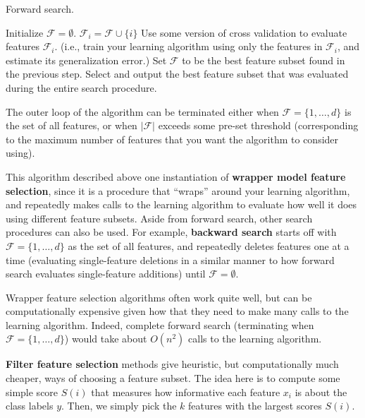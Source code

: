 \begin{algorithm}[ht]
    \caption{Forward search.}
    \label{alg:forward_search}
    \begin{algorithmic}
    \State Initialize $\mathcal{F} = \emptyset$.
    \Repeat
                \State $\mathcal{F}_i = \mathcal{F} \cup \{i\}$
                \State Use some version of cross validation to evaluate features $\mathcal{F}_i$.
                \State (i.e., train your learning algorithm using only the features in $\mathcal{F}_i$, and estimate its generalization error.)
            \EndIf
        \EndFor
        \State Set $\mathcal{F}$ to be the best feature subset found in the previous step. %
    \State Select and output the best feature subset that was evaluated during the entire search procedure.
    \end{algorithmic}
\end{algorithm}

The outer loop of the algorithm can be terminated either when $\mathcal F =
\{1,\ldots ,d\}$ is the set of all features, or when $|\mathcal F|$ exceeds some pre-set
threshold (corresponding to the maximum number of features that you want the
algorithm to consider using).

This algorithm described above one instantiation of \textbf{wrapper model
feature selection}, since it is a procedure that ``wraps'' around your learning
algorithm, and repeatedly makes calls to the learning algorithm to evaluate
how well it does using different feature subsets. Aside from forward search,
other search procedures can also be used. For example, \textbf{backward search}
starts off with $\mathcal F = \{1,\ldots ,d\}$ as the set of all features, and repeatedly deletes
features one at a time (evaluating single-feature deletions in a similar manner
to how forward search evaluates single-feature additions) until $\mathcal F = \emptyset$.

Wrapper feature selection algorithms often work quite well, but can be
computationally expensive given how that they need to make many calls to
the learning algorithm. Indeed, complete forward search (terminating when
$\mathcal F = \{1,\ldots ,d\}$) would take about $O(n^2)$ calls to the learning algorithm.

\textbf{Filter feature selection} methods give heuristic, but computationally
much cheaper, ways of choosing a feature subset. The idea here is to compute
some simple score $S(i)$ that measures how informative each feature $x_i$ is about
the class labels $y$. Then, we simply pick the $k$ features with the largest scores
$S(i)$.

